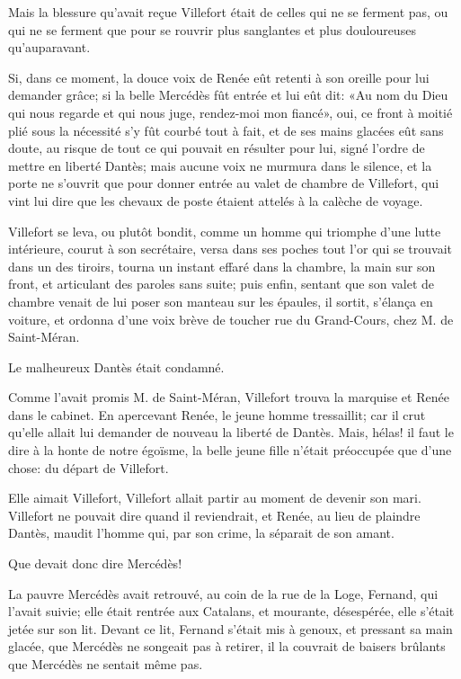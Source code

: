 Mais la blessure qu'avait reçue Villefort était de celles qui ne se ferment pas, ou qui ne se ferment que pour se rouvrir plus sanglantes et plus douloureuses qu'auparavant.

Si, dans ce moment, la douce voix de Renée eût retenti à son oreille pour lui demander grâce; si la belle Mercédès fût entrée et lui eût dit: «Au nom du Dieu qui nous regarde et qui nous juge, rendez-moi mon fiancé», oui, ce front à moitié plié sous la nécessité s'y fût courbé tout à fait, et de ses mains glacées eût sans doute, au risque de tout ce qui pouvait en résulter pour lui, signé l'ordre de mettre en liberté Dantès; mais aucune voix ne murmura dans le silence, et la porte ne s'ouvrit que pour donner entrée au valet de chambre de Villefort, qui vint lui dire que les chevaux de poste étaient attelés à la calèche de voyage.

Villefort se leva, ou plutôt bondit, comme un homme qui triomphe d'une lutte intérieure, courut à son secrétaire, versa dans ses poches tout l'or qui se trouvait dans un des tiroirs, tourna un instant effaré dans la chambre, la main sur son front, et articulant des paroles sans suite; puis enfin, sentant que son valet de chambre venait de lui poser son manteau sur les épaules, il sortit, s'élança en voiture, et ordonna d'une voix brève de toucher rue du Grand-Cours, chez M. de Saint-Méran.

Le malheureux Dantès était condamné.

Comme l'avait promis M. de Saint-Méran, Villefort trouva la marquise et Renée dans le cabinet. En apercevant Renée, le jeune homme tressaillit; car il crut qu'elle allait lui demander de nouveau la liberté de Dantès. Mais, hélas! il faut le dire à la honte de notre égoïsme, la belle jeune fille n'était préoccupée que d'une chose: du départ de Villefort.

Elle aimait Villefort, Villefort allait partir au moment de devenir son mari. Villefort ne pouvait dire quand il reviendrait, et Renée, au lieu de plaindre Dantès, maudit l'homme qui, par son crime, la séparait de son amant.

Que devait donc dire Mercédès!

La pauvre Mercédès avait retrouvé, au coin de la rue de la Loge, Fernand, qui l'avait suivie; elle était rentrée aux Catalans, et mourante, désespérée, elle s'était jetée sur son lit. Devant ce lit, Fernand s'était mis à genoux, et pressant sa main glacée, que Mercédès ne songeait pas à retirer, il la couvrait de baisers brûlants que Mercédès ne sentait même pas.

